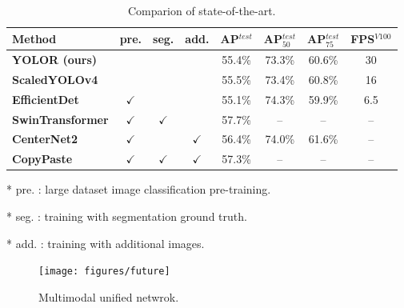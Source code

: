 \documentclass[10pt,twocolumn,letterpaper]{article}
\begin{document}
\begin{table}[h]
\centering
\vspace{-2mm}
\begin{threeparttable}[h]
	\footnotesize
	\caption{Comparion of state-of-the-art.}
	\label{table:sota}
	\setlength\tabcolsep{.8pt}
	\begin{tabular}{lccccccc}
		\toprule
		\textbf{Method} & \textbf{pre.} & \textbf{seg.} & \textbf{add.} & \textbf{AP$^{test}$} & \textbf{AP$^{test}_{50}$} & \textbf{AP$^{test}_{75}$} & \textbf{FPS$^{V100}$} \\				
		\midrule
		\textbf{YOLOR (ours)} &  &  &  & 55.4\% & 73.3\% & 60.6\% & 30 \\
		\textbf{ScaledYOLOv4 \cite{wang2020scaled}} &  &  &  & 55.5\% & 73.4\% & 60.8\% & 16 \\	
		\textbf{EfficientDet \cite{tan2019efficientdet}} & $\checkmark$ &  &  & 55.1\% & 74.3\% & 59.9\% & 6.5 \\	
		\textbf{SwinTransformer \cite{liu2021swin}} & $\checkmark$ & $\checkmark$ &  & 57.7\% & -- & -- & -- \\	
		\textbf{CenterNet2 \cite{zhou2021probabilistic}} & $\checkmark$ &  & $\checkmark$ & 56.4\% & 74.0\% & 61.6\% & -- \\	
		\textbf{CopyPaste \cite{ghiasi2020simple}} & $\checkmark$ & $\checkmark$ & $\checkmark$ & 57.3\% & -- & -- & -- \\
		\bottomrule
	\end{tabular}
	\begin{tablenotes}[flushleft]
		\footnotesize
		\item[*] pre. : large dataset image classification pre-training.
		\item[*] seg. : training with segmentation ground truth.
		\item[*] add. : training with additional images.
	\end{tablenotes}
\end{threeparttable}
\vspace{-6mm}
\end{table}

\begin{figure}[t]
	\begin{center}
		\texttt{[image: figures/future]}
	\end{center}
    \vspace{2mm}
	\caption{Multimodal unified netwrok.}
	\label{fig:fut}
	\vspace{-6mm}
\end{figure}
\end{document}

